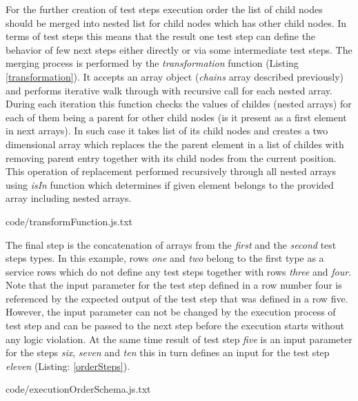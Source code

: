 For the further creation of test steps execution order the list of child nodes should be merged into nested list for child nodes which has other child nodes. In terms of test steps this means that the result one test step can define the behavior of few next steps either directly or via some intermediate test steps. 
The merging process is performed by the \textit{transformation} function (Listing \ref{transformation}). It accepts an array object (\textit{chains} array described previously) and performs iterative walk through with recursive call for each nested array. During each iteration this function checks the values of childes (nested arrays) for each of them being a parent for other child nodes (is it present as a first element in next arrays). In such case it takes list of its child nodes and creates a two dimensional array which replaces the the parent element in a list of childes with removing parent entry together with its child nodes from the current position. This operation of replacement performed recursively through all nested arrays using \textit{isIn} function which determines if given element belongs to the provided array including nested arrays.


{code/transformFunction.js.txt}

The final step is the  concatenation of arrays from the \textit{first} and the \textit{second} test steps types. In this example, rows \textit{one} and \textit{two} belong to the first type as a service rows which do not define any test steps together with rows \textit{three} and \textit{four}. Note that the input parameter for the test step defined in a row number four is referenced by the expected output of the test step that was defined in a row five. However, the input parameter can not be changed by the execution process of test step and can be passed to the next step before the execution starts without any logic violation. At the same time result of test step \textit{five} is an input parameter for the steps \textit{six}, \textit{seven} and \textit{ten} this in turn defines an input for the test step \textit{eleven} (Listing: \ref{orderSteps}).

{code/executionOrderSchema.js.txt}


